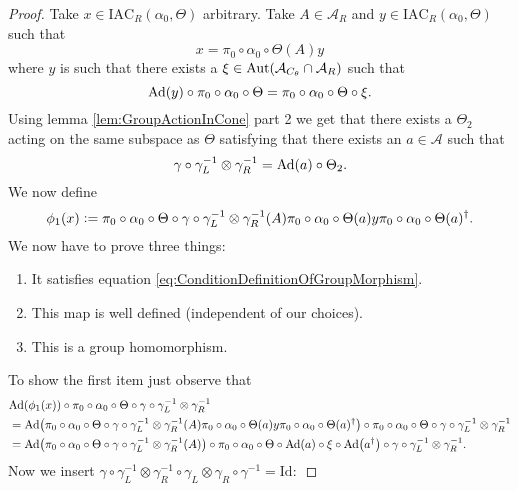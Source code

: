 \documentclass[12pt,a4paper,twoside]{article}
\newcommand{\defeq}{\vcentcolon=}
\let\originalleft\left
\let\originalright\right
\renewcommand{\left}{\mathopen{}\mathclose\bgroup\originalleft}
\renewcommand{\right}{\aftergroup\egroup\originalright}
\renewcommand{\AA}{\mathcal A}
\newcommand{\Ad}[1]{\textrm{Ad}\left(#1\right)}
\newcommand{\Aut}[1]{\textrm{Aut}\left(#1\right)}
\theoremstyle{definition}
\numberwithin{equation}{section}
\begin{document}
\begin{proof}
	Take $x\in \textrm{IAC}_R(\alpha_0,\Theta)$ arbitrary. Take $A\in\AA_R$ and $y\in\textrm{IAC}_R(\alpha_0,\Theta)$ such that
	\begin{equation}
	x=\pi_0\circ\alpha_0\circ\Theta(A)y
	\end{equation}
	where $y$ is such that there exists a $\xi\in\Aut{\AA_{C_\theta}\cap \AA_R}$ such that
	\begin{equation}
	\Ad{y}\circ\pi_0\circ\alpha_0\circ\Theta=\pi_0\circ\alpha_0\circ\Theta\circ\xi.
	\end{equation}
	Using lemma \ref{lem:GroupActionInCone} part 2 we get that there exists a $\Theta_2$ acting on the same subspace as $\Theta$ satisfying that there exists an $a\in\AA$ such that
	\begin{equation}\label{eq:ConePropertyLemmaDefinitionOfGroupMorphism}
		\gamma\circ\gamma_L^{-1}\otimes\gamma_R^{-1}=\Ad{a}\circ\Theta_2.
	\end{equation}
	We now define
	\begin{equation}
		\phi_1(x)\defeq \pi_0\circ\alpha_0\circ\Theta\circ\gamma\circ\gamma_L^{-1}\otimes\gamma_R^{-1}(A)\pi_0\circ\alpha_0\circ\Theta(a)y\pi_0\circ\alpha_0\circ\Theta(a)^\dagger.
	\end{equation}
	We now have to prove three things:
	\begin{enumerate}
		\item It satisfies equation \eqref{eq:ConditionDefinitionOfGroupMorphism}.
		\item This map is well defined (independent of our choices).
		\item This is a group homomorphism.
	\end{enumerate}
	To show the first item just observe that
	\begin{align}
		&\Ad{\phi_1(x)}\circ\pi_0\circ\alpha_0\circ\Theta\circ\gamma\circ\gamma_L^{-1}\otimes\gamma_R^{-1}\\
		&=\Ad{\pi_0\circ\alpha_0\circ\Theta\circ\gamma\circ\gamma_L^{-1}\otimes\gamma_R^{-1}(A)\pi_0\circ\alpha_0\circ\Theta(a)y\pi_0\circ\alpha_0\circ\Theta(a)^\dagger}\circ\pi_0\circ\alpha_0\circ\Theta\circ\gamma\circ\gamma_L^{-1}\otimes\gamma_R^{-1}\\
		&=\Ad{\pi_0\circ\alpha_0\circ\Theta\circ\gamma\circ\gamma_L^{-1}\otimes\gamma_R^{-1}(A)}\circ\pi_0\circ\alpha_0\circ\Theta\circ\Ad{a}\circ\xi\circ\Ad{a^\dagger}\circ\gamma\circ\gamma_L^{-1}\otimes\gamma_R^{-1}.
	\end{align}
	Now we insert $\gamma\circ\gamma_L^{-1}\otimes\gamma_R^{-1}\circ\gamma_L\otimes\gamma_R\circ\gamma^{-1}=\text{Id}:$

\end{proof}
\end{document}
